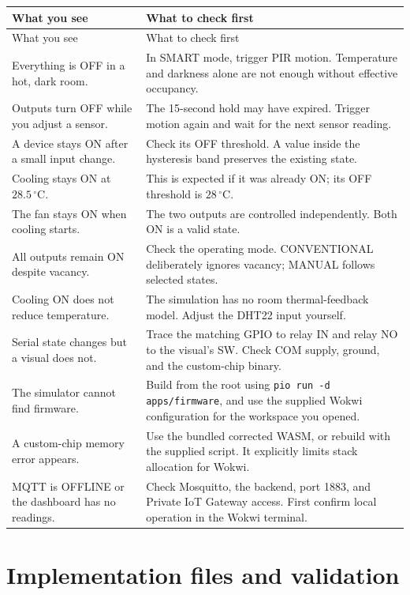 \documentclass[11pt,a4paper]{article}
\newcommand{\temp}[1]{\ensuremath{#1\,^{\circ}\mathrm{C}}}
\begin{document}
\begin{longtable}{@{}p{}p{}@{}}
\toprule
What you see & What to check first \\
\midrule
\endfirsthead
\toprule
What you see & What to check first \\
\midrule
\endhead
Everything is OFF in a hot, dark room. &
In SMART mode, trigger PIR motion. Temperature and darkness alone are
not enough without effective occupancy. \\
Outputs turn OFF while you adjust a sensor. &
The 15-second hold may have expired. Trigger motion again and wait for
the next sensor reading. \\
A device stays ON after a small input change. &
Check its OFF threshold. A value inside the hysteresis band preserves
the existing state. \\
Cooling stays ON at \temp{28.5}. &
This is expected if it was already ON; its OFF threshold is \temp{28}. \\
The fan stays ON when cooling starts. &
The two outputs are controlled independently. Both ON is a valid state. \\
All outputs remain ON despite vacancy. &
Check the operating mode. CONVENTIONAL deliberately ignores vacancy;
MANUAL follows selected states. \\
Cooling ON does not reduce temperature. &
The simulation has no room thermal-feedback model. Adjust the DHT22
input yourself. \\
Serial state changes but a visual does not. &
Trace the matching GPIO to relay IN and relay NO to the visual's SW.
Check COM supply, ground, and the custom-chip binary. \\
The simulator cannot find firmware. &
Build from the root using \lstinline|pio run -d apps/firmware|, and
use the supplied Wokwi configuration for the workspace you opened. \\
A custom-chip memory error appears. &
Use the bundled corrected WASM, or rebuild with the supplied script.
It explicitly limits stack allocation for Wokwi. \\
MQTT is OFFLINE or the dashboard has no readings. &
Check Mosquitto, the backend, port 1883, and Private IoT Gateway access.
First confirm local operation in the Wokwi terminal. \\
\bottomrule
\end{longtable}

\section{Implementation files and validation}
\end{document}
